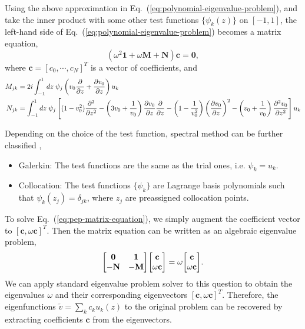 Using the above approximation in Eq.~(\ref{eq:polynomial-eigenvalue-problem}), and take the inner product with some other test functions $\{\psi_k(z)\}$ on $[-1,1]$, the left-hand side of Eq.~(\ref{eq:polynomial-eigenvalue-problem}) becomes a matrix equation,
\begin{equation}
	(\omega^2\mathbf{1} + \omega\mathbf{M} + \mathbf{N})\mathbf{c} = \mathbf{0},
	\label{eq:pep-matrix-equation}
\end{equation}
where $\mathbf{c} = [c_0, \cdots, c_N]^T$ is a vector of coefficients, and
\begin{align}
	M_{jk} & = 2i\int_{-1}^{1}dz \; \psi_{j}\left(v_0\pdv{}{z} +\pdv{v_0}{z} \right)u_{k}
	\label{eq:operator-matrix-M}                                                          \\
	N_{jk} & = \int_{-1}^{1}dz \; \psi_{j} \left[(1-v_0^2)\pdv[2]{}{z}
		-\left(3v_0 + \frac{1}{v_0}\right)\pdv{v_0}{z}\pdv{}{z}
		- \left(1-\frac{1}{v_0^2}\right)\left(\pdv{v_0}{z}\right)^2
		- \left(v_0+\frac{1}{v_0}\right)\pdv[2]{v_0}{z}\right] u_{k}
	\label{eq:operator-matrix-N}
\end{align}

Depending on the choice of the test function, spectral method can be further classified \cite{shen_tang_etal_spectral_2011},
\begin{itemize}
	\item Galerkin: The test functions are the same as the trial ones, i.e. $\psi_k=u_k$.
	\item Collocation:  The test functions $\{\psi_k\}$ are Lagrange basis polynomials such that $\psi_k(z_j)=\delta_{jk}$, where ${z_j}$ are preassigned collocation points.
\end{itemize}

To solve Eq.~(\ref{eq:pep-matrix-equation}), we simply augment the coefficient vector to $[\mathbf{c}, \omega\mathbf{c}]^T$. Then the matrix equation can be written as an algebraic eigenvalue problem,
\begin{equation} \label{eq:eigenvalue-problem}
	\mqty[ \mathbf{0} & \mathbf{1}\\ -\mathbf{N} & -\mathbf{M} ]\mqty[ \mathbf{c}\\ \omega\mathbf{c}] = \omega\mqty[ \mathbf{c}\\ \omega\mathbf{c}].
\end{equation}
We can apply standard eigenvalue problem solver to this question to obtain the eigenvalues $\omega$ and their corresponding eigenvectors $[\mathbf{c}, \omega\mathbf{c}]^T$. Therefore, the eigenfunctions $\tilde{v} = \sum_k c_ku_k(z)$ to the original problem can be recovered by extracting coefficients $\mathbf{c}$ from the eigenvectors.

